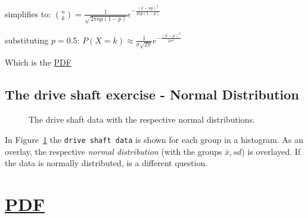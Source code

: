 \documentclass[
  a4paper,
]{scrbook}
\begin{document}
simplifies to:
\(\binom{n}{k} = \frac{1}{\sqrt{2\pi n p (1-p)}}e^{-\frac{(k-np)^2}{2np(1-p)}}\)

substituting \(p=0.5\):
\(P(X = k) \approx \frac{1}{\sigma\sqrt{2\pi}}e^{-\frac{(k-\mu)^2}{2\sigma^2}}\)

Which is the \hyperref[acronyms_PDF]{PDF}

\subsection{The drive shaft exercise - Normal
Distribution}\label{the-drive-shaft-exercise---normal-distribution}

\begin{figure}[ht]


\caption{\label{fig-ds-nd}The drive shaft data with the respective
normal distributions.}

\end{figure}%

In Figure~\ref{fig-ds-nd} the \texttt{drive\ shaft\ data} is shown for
each group in a histogram. As an overlay, the respective \emph{normal
distribution} (with the groups \(\bar{x},sd\)) is overlayed. If the data
is normally distributed, is a different question.

\section{\texorpdfstring{\hyperref[acronyms_PDF]{PDF}}{PDF}}\label{section-3}
\end{document}
